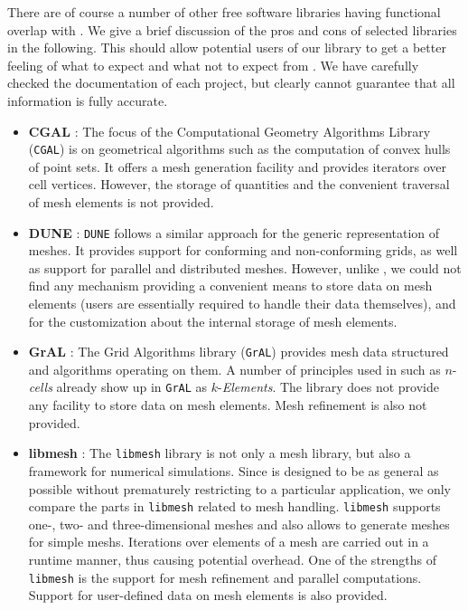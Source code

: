 There are of course a number of other free software libraries having functional overlap with {\ViennaGrid}. We give a brief discussion of the pros and cons of selected libraries in the following. This should allow potential users of our library to get a better feeling of what to expect and what not to expect from {\ViennaGrid}. We have carefully checked the documentation of each project, but clearly cannot guarantee that all information is fully accurate.
\begin{itemize}
  \item \textbf{CGAL} \cite{CGAL}: The focus of the Computational Geometry Algorithms Library (\texttt{CGAL}) is on geometrical algorithms such as the computation of convex hulls of point sets. It offers a mesh generation facility and provides iterators over cell vertices. However, the storage of quantities and the convenient traversal of mesh elements is not provided.

  \item \textbf{DUNE} \cite{DUNE}: \texttt{DUNE} follows a similar approach for the generic representation of meshes. It provides support for conforming and non-conforming grids, as well as support for parallel and distributed meshes. However, unlike {\ViennaGrid}, we could not find any mechanism providing a convenient means to store data on mesh elements (users are essentially required to handle their data themselves), and for the customization about the internal storage of mesh elements.

  \item \textbf{GrAL} \cite{GrAL}: The Grid Algorithms library (\texttt{GrAL}) provides mesh data structured and algorithms operating on them. A number of principles used in {\ViennaGrid} such as $n$-\textit{cells} already show up in \texttt{GrAL} as $k$-\textit{Elements}. The library does not provide any facility to store data on mesh elements. Mesh refinement is also not provided.

  \item \textbf{libmesh} \cite{libmesh}: The \texttt{libmesh} library is not only a mesh library, but also a framework for numerical simulations. Since {\ViennaGrid} is designed to be as general as possible without prematurely restricting to a particular application, we only compare the parts in \texttt{libmesh} related to mesh handling. \texttt{libmesh} supports one-, two- and three-dimensional meshes and also allows to generate meshes for simple meshs. Iterations over elements of a mesh are carried out in a runtime manner, thus causing potential overhead. One of the strengths of \texttt{libmesh} is the support for mesh refinement and parallel computations. Support for user-defined data on mesh elements is also provided.


\end{itemize}
